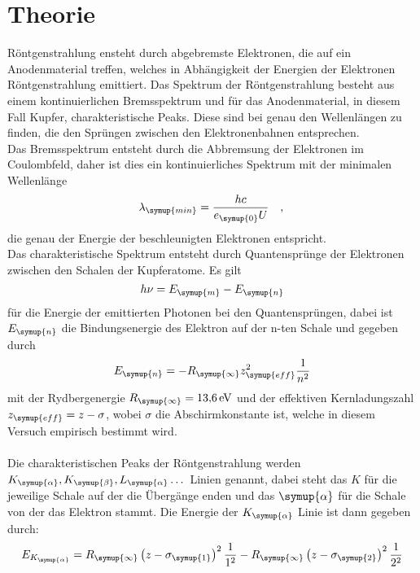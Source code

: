 \section{Theorie}
\label{sec:Theorie}
Röntgenstrahlung ensteht durch abgebremste Elektronen, die auf ein Anodenmaterial
treffen, welches in Abhängigkeit der Energien der Elektronen Röntgenstrahlung
emittiert. Das Spektrum der Röntgenstrahlung besteht aus einem kontinuierlichen Bremsspektrum
und für das Anodenmaterial, in diesem Fall Kupfer, charakteristische Peaks.
Diese sind bei genau den Wellenlängen zu finden, die den Sprüngen zwischen den
Elektronenbahnen entsprechen.\\
Das Bremsspektrum entsteht durch die Abbremsung der Elektronen im Coulombfeld, daher ist
dies ein kontinuierliches Spektrum mit der minimalen Wellenlänge
\begin{equation}
  \lambda_\symup{min} = \dfrac{hc}{e_\symup{0}U} \quad,
  \label{eqn:lambda_min}\\
\end{equation}
die genau der Energie der beschleunigten Elektronen entspricht.\\
Das charakteristische Spektrum entsteht durch Quantensprünge der Elektronen zwischen
den Schalen der Kupferatome. Es gilt
\begin{equation}
  h \nu = E_\symup{m} - E_\symup{n}
  \label{eqn:hnu}\\
\end{equation}
für die Energie der emittierten Photonen bei den Quantensprüngen, dabei ist $E_\symup{n}$ die
Bindungsenergie des Elektron auf der n-ten Schale und gegeben durch
\begin{equation}
  E_\symup{n} = -R_\symup{\infty} z_\symup{eff}^2 \dfrac{1}{n^2}
  \label{eqn:E_n}\\
\end{equation}
mit der Rydbergenergie $R_\symup{\infty} = \SI{13.6}{\electronvolt}$ und der effektiven
Kernladungszahl $z_\symup{eff} = z - \sigma$, wobei $\sigma$ die Abschirmkonstante ist, welche
in diesem Versuch empirisch bestimmt wird.\\\\
Die charakteristischen Peaks der Röntgenstrahlung werden $K_\symup{\alpha},K_\symup{\beta},
L_\symup{\alpha}\dots$ Linien genannt, dabei steht das $K$ für die jeweilige Schale auf der die Übergänge
enden und das $\symup{\alpha}$ für die Schale von der das Elektron stammt. Die Energie
der $K_\symup{\alpha}$ Linie ist dann gegeben durch:
\begin{align}
  E_{K_\symup{\alpha}} = R_\symup{\infty} \left(z - \sigma_\symup{1} \right)^2\dfrac{1}{1^2} -
  R_\symup{\infty}\left(z - \sigma_\symup{2}\right)^2 \dfrac{1}{2^2}
  \label{eqn:E_K_a}
\end{align}
